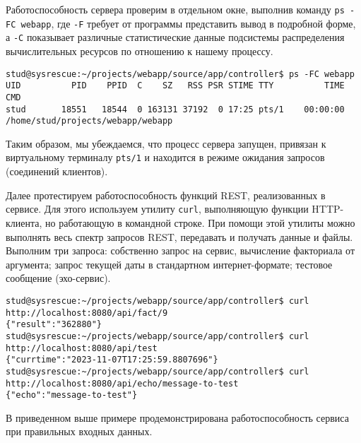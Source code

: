 \documentclass[732]{studrep}
\begin{document}
Работоспособность сервера проверим в отдельном окне, выполнив команду \texttt{ps -FC webapp}, где \texttt{-F} требует от программы представить вывод в подробной форме, а \texttt{-C} показывает различные статистические данные подсистемы распределения вычислительных ресурсов по отношению к нашему процессу.

\begin{verbatim}
stud@sysrescue:~/projects/webapp/source/app/controller$ ps -FC webapp
UID          PID    PPID  C    SZ   RSS PSR STIME TTY          TIME CMD
stud       18551   18544  0 163131 37192  0 17:25 pts/1    00:00:00 /home/stud/projects/webapp/webapp
\end{verbatim}
Таким образом, мы убеждаемся, что процесс сервера запущен, привязан к виртуальному терминалу \texttt{pts/1} и находится в режиме ожидания запросов (соединений клиентов).

Далее протестируем работоспособность функций REST, реализованных в сервисе. Для этого используем утилиту \texttt{curl}, выполняющую функции HTTP-клиента, но работающую в командной строке.  При помощи этой утилиты можно выполнять весь спектр запросов REST, передавать и получать данные и файлы.  Выполним три запроса: собственно запрос на сервис, вычисление факториала от аргумента; запрос текущей даты в стандартном интернет-формате; тестовое сообщение (эхо-сервис).

\begin{verbatim}
stud@sysrescue:~/projects/webapp/source/app/controller$ curl http://localhost:8080/api/fact/9
{"result":"362880"}
stud@sysrescue:~/projects/webapp/source/app/controller$ curl http://localhost:8080/api/test
{"currtime":"2023-11-07T17:25:59.8807696"}
stud@sysrescue:~/projects/webapp/source/app/controller$ curl http://localhost:8080/api/echo/message-to-test
{"echo":"message-to-test"}
\end{verbatim}
В приведенном выше примере продемонстрирована работоспособность сервиса при правильных входных данных.
\end{document}
